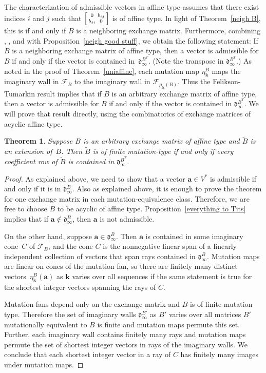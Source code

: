 \documentclass{amsart}
\newtheorem{theorem}[proposition]{Theorem}
\theoremstyle{definition}
\theoremstyle{remark}
\numberwithin{equation}{section}
\newcommand{\F}{{\mathcal F}}
\newcommand{\0}{{\mathbf{0}}}
\renewcommand{\b}{\mathbf{b}}
\newcommand{\kk}{{\boldsymbol{k}}}
\renewcommand{\a}{\mathbf{a}}
\newcommand{\tB}{{\widetilde{B}}}
\renewcommand{\d}{{\mathfrak d}}
\begin{document}
The characterization of admissible vectors in affine type assumes that there exist indices $i$ and $j$ such that $\begin{bsmallmatrix}0&b_{ij}\\b_{ji}&0\end{bsmallmatrix}$ is of affine type.
In light of Theorem~\ref{neigh B}, this is if and only if $B$ is a neighboring exchange matrix.
Furthermore, combining \mbox{\cite[Theorem~4.4]{FeTuCoeff}}, \cite[Theorem~9.4]{FeTuCoeff}, and \cite[Theorem~9.6]{FeTuCoeff} with Proposition~\ref{neigh good stuff}, we obtain the following statement:
If $B$ is a neighboring exchange matrix of affine type, then a vector is admissible for $B$ if and only if the vector is contained in~$\d_\infty^{B^T}$.
(Note the transpose in $\d_\infty^{B^T}$.)
As noted in the proof of Theorem~\ref{uniaffine}, each mutation map $\eta_\kk^B$ maps the imaginary wall in $\F_B$ to the imaginary wall in $\F_{\mu_\kk(B)}$.
Thus the Felikson-Tumarkin result implies that if $B$ is an arbitrary exchange matrix of affine type, then a vector is admissible for $B$ if and only if the vector is contained in $\d_\infty^{B^T}$.
We will prove that result directly, using the combinatorics of exchange matrices of acyclic affine type.

\begin{theorem}\label{mutfin coeff}
Suppose $B$ is an arbitrary exchange matrix of affine type and $\tB$ is an extension of~$B$.
Then $\tB$ is of finite mutation-type if and only if every coefficient row of $\tB$ is contained in $\d_\infty^{B^T}$.
\end{theorem}

\begin{proof}%
As explained above, we need to show that a vector $\a\in V^*$ is admissible if and only if it is in $\d_\infty^B$.
Also as explained above, it is enough to prove the theorem for one exchange matrix in each mutation-equivalence class.
Therefore, we are free to choose $B$ to be acyclic of affine type.
Proposition~\ref{everything to Tits} implies that if $\a\not\in\d_\infty^B$, then $\a$ is not admissible.

On the other hand, suppose $\a\in\d_\infty^B$.
Then $\a$ is contained in some imaginary cone~$C$ of $\F_B$, and the cone $C$ is the nonnegative linear span of a linearly independent collection of vectors that span rays contained in $\d_\infty^B$.
Mutation maps are linear on cones of the mutation fan, so there are finitely many distinct vectors~$\eta_\kk^B(\a)$ as $\kk$ varies over all sequences if the same statement is true for the shortest integer vectors spanning the rays of $C$.

Mutation fans depend only on the exchange matrix and $B$ is of finite mutation type. 
Therefore the set of imaginary walls $\d_\infty^{B'}$ as $B'$ varies over all matrices $B'$ mutationally equivalent to $B$ is finite and mutation maps permute this set.
Further, each imaginary wall contains finitely many rays and mutation maps permute the set of shortest integer vectors in rays of the imaginary walls.
We conclude that each shortest integer vector in a ray of $C$ has finitely many images under mutation maps. 
\end{proof}
\end{document}
